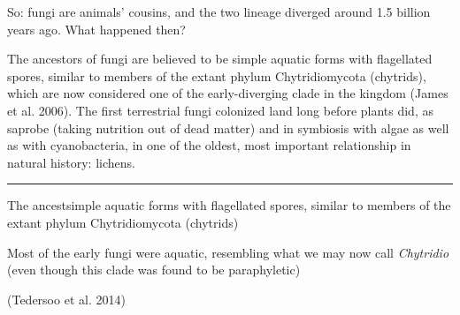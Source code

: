So: fungi are animals' cousins, and the two lineage diverged around 1.5 billion years ago. What happened then?

The ancestors of fungi are believed to be simple aquatic forms with flagellated spores, similar to members of the extant phylum Chytridiomycota (chytrids), which are now considered one of the early-diverging clade in the kingdom (James et al. 2006). The first terrestrial fungi colonized land long before plants did, as saprobe (taking nutrition out of dead matter) and in symbiosis with algae as well as with cyanobacteria, in one of the oldest, most important relationship in natural history: lichens.

\begin{center}\rule{3in}{0.4pt}\end{center}

The ancestsimple aquatic forms with flagellated spores, similar to members of the extant phylum Chytridiomycota (chytrids)

Most of the early fungi were aquatic, resembling what we may now call \emph{Chytridio} (even though this clade was found to be paraphyletic)

(Tedersoo et al. 2014)




